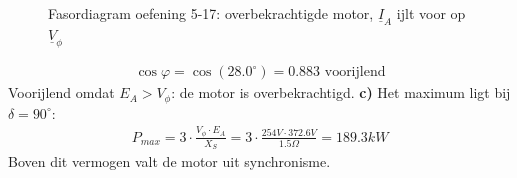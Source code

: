 \begin{oefenblok}
\begin{figure}[H]
  \caption{Fasordiagram oefening 5-17: overbekrachtigde motor, $\underline{I}_A$ ijlt voor op $\underline{V}_\phi$}
  \label{fig:fasor-oef5-17}
\end{figure}
\begin{align*}
    \cos\varphi = \cos(28.0^\circ) = 0.883 \text{ voorijlend}
\end{align*}
Voorijlend omdat $E_A > V_\phi$: de motor is overbekrachtigd.
\newline
\textbf{c)}
Het maximum ligt bij $\delta = 90^\circ$:
\begin{align*}
    P_{max} = 3 \cdot \frac{V_\phi \cdot E_A}{X_S} = 3 \cdot \frac{254 V \cdot 372.6 V}{1.5 \Omega} = 189.3 kW
\end{align*}
Boven dit vermogen valt de motor uit synchronisme.
\end{oefenblok}


\newpage
